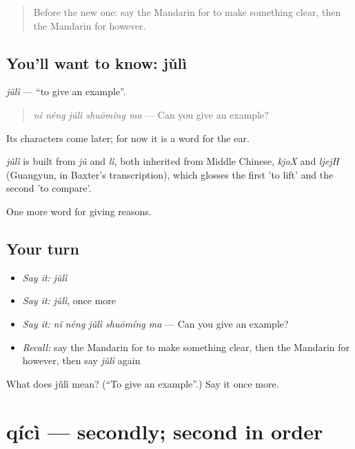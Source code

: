\begin{quote}
Before the new one: say the Mandarin for to make something clear, then the Mandarin for however.
\end{quote}

\subsection*{You'll want to know: jǔlì}
\emph{jǔlì} — \textquotedblleft{}to give an example\textquotedblright{}.

\begin{quote}
\emph{nǐ néng jǔlì shuōmíng ma} — Can you give an example?
\end{quote}

Its characters come later; for now it is a word for the ear.

\begin{cousinweb}
\emph{jǔlì} is built from \emph{jǔ} and \emph{lì}, both inherited from Middle Chinese, \emph{kjoX} and \emph{ljejH} (Guangyun, in Baxter's transcription), which glosses the first 'to lift' and the second 'to compare'.
\end{cousinweb}

\begin{grammarlens}[title={What you've built}]
One more word for giving reasons.
\end{grammarlens}

\subsection*{Your turn}
\begin{itemize}
\raggedright
  \item \emph{Say it:} \emph{jǔlì}
  \item \emph{Say it:} \emph{jǔlì}, once more
  \item \emph{Say it:} \emph{nǐ néng jǔlì shuōmíng ma} — Can you give an example?
  \item \emph{Recall:} say the Mandarin for to make something clear, then the Mandarin for however, then say \emph{jǔlì} again
\end{itemize}

\begin{tcolorbox}[breakable,colback=teal!4,colframe=teal!35!black,title={Before you move on}]
What does jǔlì mean? (\textquotedblleft{}To give an example\textquotedblright{}.) Say it once more.
\end{tcolorbox}
\section[qícì]{qícì — secondly; second in order}

